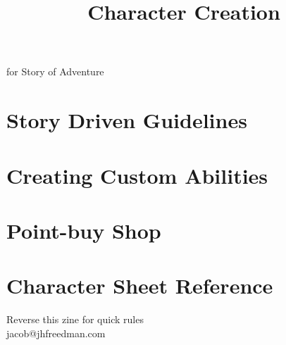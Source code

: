 \documentclass[statementpaper,oneside,article,14pt]{memoir}
\newcommand{\BackgroundPic}[1]{%
	\put(0,0){%
		\parbox[b][\paperheight]{\paperwidth}{%
			\vfill
			\centering
			{\transparent{0.4} \texttt{[image: \#1]}}%
			\vfill
}}}
\begin{document}
	
	
	\title{Character Creation}
	\date{}
	\begingroup
	\let\cleardoublepage\clearpage
	
	
	\begin{titlingpage}
		\maketitle
		
		for Story of Adventure
		
	\end{titlingpage}
	
	\endgroup
	
	\pagestyle{empty}
	
	
	
	\section*{Story Driven Guidelines}
	
	\section*{Creating Custom Abilities}
	
	\section*{Point-buy Shop}
	
	\section*{Character Sheet Reference}
	
	
	
	\newpage
	
	Reverse this zine for quick rules
	\\jacob@jhfreedman.com
	
\end{document}

